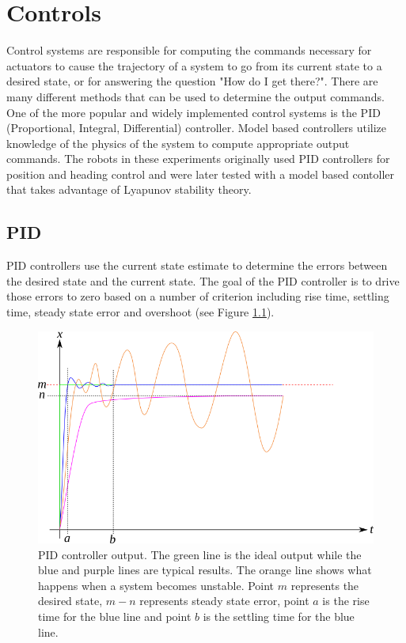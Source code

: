 \chapter{Controls}
\label{ch:controls}
Control systems are responsible for computing the commands necessary for actuators to cause the trajectory of a system to go from its current state to a desired state, or for answering the question "How do I get there?". There are many different methods that can be used to determine the output commands. One of the more popular and widely implemented control systems is the PID (Proportional, Integral, Differential) controller. Model based controllers utilize knowledge of the physics of the system to compute appropriate output commands. The robots in these experiments originally used PID controllers for position and heading control and were later tested with a model based contoller that takes advantage of Lyapunov stability theory.

\section{PID}
\label{sec:pid}
PID controllers use the current state estimate to determine the errors between the desired state and the current state. The goal of the PID controller is to drive those errors to zero based on a number of criterion including rise time, settling time, steady state error and overshoot (see Figure \ref{fig:pid}).

\begin{figure}[ht!]
	\centering
	\includegraphics[width=.85\textwidth]{images/pid}
	\caption{PID controller output. The green line is the ideal output while the blue and purple lines are typical results. The orange line shows what happens when a system becomes unstable. Point $m$ represents the desired state, $m-n$ represents steady state error, point $a$ is the rise time for the blue line and point $b$ is the settling time for the blue line.}
	\label{fig:pid}
\end{figure}

